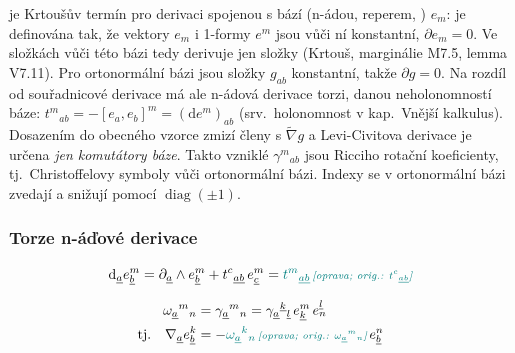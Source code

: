 \begin{vysvetleni}
 je Krtoušův termín pro derivaci spojenou s bází (n-ádou, reperem, ) $e_m$: je definována tak, že vektory $e_m$ i 1-formy $e^m$ jsou vůči ní konstantní, $\partial e_m=0$. Ve složkách vůči této bázi tedy derivuje jen složky (Krtouš, marginálie M7.5, lemma V7.11). Pro ortonormální bázi jsou složky $g_{ab}$ konstantní, takže $\partial g=0$.
Na rozdíl od souřadnicové derivace má ale n-ádová derivace torzi, danou neholonomností báze: $t^m{}_{ab}=-[e_a,e_b]^m=(\mathrm{d}e^m)_{ab}$ (srv.\ holonomnost v kap.\ Vnější kalkulus). Dosazením do obecného vzorce zmizí členy s $\tilde\nabla g$ a Levi-Civitova derivace je určena \emph{jen komutátory báze}. Takto vzniklé $\gamma^m{}_{ab}$ jsou Ricciho rotační koeficienty, tj.\ Christoffelovy symboly vůči ortonormální bázi. Indexy se v ortonormální bázi zvedají a snižují pomocí $\operatorname{diag}(\pm1)$.
\end{vysvetleni}

\subsubsection*{Torze n-áďové derivace}
\[
  \mathrm{d}_{\underline{a}}e^m_{\underline{b}} = \partial_{\underline{a}}\wedge e^m_{\underline{b}} + t^c{}_{\underline{ab}}\,e^m_{\underline{c}} = \oprava{t^m{}_{\underline{ab}}}{t^c{}_{\underline{ab}}}
\]

\begin{align*}
  \omega_{\underline{a}}{}^m{}_n &= \gamma_{\underline{a}}{}^m{}_n = \gamma_{\underline{a}}{}^{\underline{k}}{}_{\underline{l}}\,e^m_{\underline{k}}\,e^{\underline{l}}_n \\
  \text{tj.}\quad \nabla_{\underline{a}}e^k_{\underline{b}} &= -\oprava{\omega_{\underline{a}}{}^k{}_n}{\omega_{\underline{a}}{}^m{}_n}\,e^n_{\underline{b}}
\end{align*}

